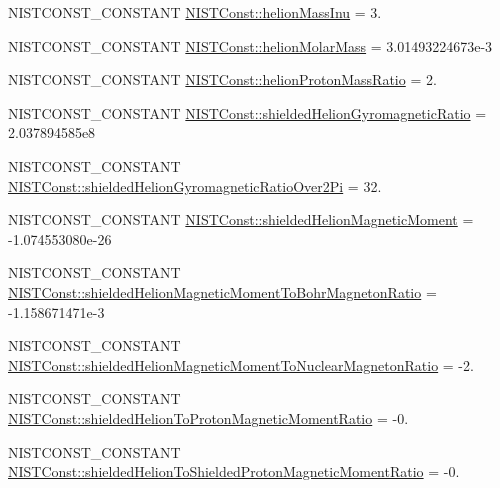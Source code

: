 \begin{DoxyCompactItemize}
\item 
N\+I\+S\+T\+C\+O\+N\+S\+T\+\_\+\+C\+O\+N\+S\+T\+A\+NT \mbox{\hyperlink{group___n_i_s_t_const-_helion_ga6a7b83837aedeb0fc0e2c4640253d1cb}{N\+I\+S\+T\+Const\+::helion\+Mass\+Inu}} = 3.
\item 
N\+I\+S\+T\+C\+O\+N\+S\+T\+\_\+\+C\+O\+N\+S\+T\+A\+NT \mbox{\hyperlink{group___n_i_s_t_const-_helion_ga9bf06c78bcf918e6d6e46539b1dc0ce1}{N\+I\+S\+T\+Const\+::helion\+Molar\+Mass}} = 3.\+01493224673e-\/3
\item 
N\+I\+S\+T\+C\+O\+N\+S\+T\+\_\+\+C\+O\+N\+S\+T\+A\+NT \mbox{\hyperlink{group___n_i_s_t_const-_helion_ga23660bb2e50738f34033e672a99e1194}{N\+I\+S\+T\+Const\+::helion\+Proton\+Mass\+Ratio}} = 2.
\item 
N\+I\+S\+T\+C\+O\+N\+S\+T\+\_\+\+C\+O\+N\+S\+T\+A\+NT \mbox{\hyperlink{group___n_i_s_t_const-_helion_ga642741fc0aa8b2966b78b252304d521c}{N\+I\+S\+T\+Const\+::shielded\+Helion\+Gyromagnetic\+Ratio}} = 2.\+037894585e8
\item 
N\+I\+S\+T\+C\+O\+N\+S\+T\+\_\+\+C\+O\+N\+S\+T\+A\+NT \mbox{\hyperlink{group___n_i_s_t_const-_helion_gae89da246fab4d96613f6365bc4c895cf}{N\+I\+S\+T\+Const\+::shielded\+Helion\+Gyromagnetic\+Ratio\+Over2\+Pi}} = 32.
\item 
N\+I\+S\+T\+C\+O\+N\+S\+T\+\_\+\+C\+O\+N\+S\+T\+A\+NT \mbox{\hyperlink{group___n_i_s_t_const-_helion_ga425da6143b23f32e91a4bed842e2f6d5}{N\+I\+S\+T\+Const\+::shielded\+Helion\+Magnetic\+Moment}} = -\/1.\+074553080e-\/26
\item 
N\+I\+S\+T\+C\+O\+N\+S\+T\+\_\+\+C\+O\+N\+S\+T\+A\+NT \mbox{\hyperlink{group___n_i_s_t_const-_helion_ga7b496ea143c3603e453977b9db2da2d7}{N\+I\+S\+T\+Const\+::shielded\+Helion\+Magnetic\+Moment\+To\+Bohr\+Magneton\+Ratio}} = -\/1.\+158671471e-\/3
\item 
N\+I\+S\+T\+C\+O\+N\+S\+T\+\_\+\+C\+O\+N\+S\+T\+A\+NT \mbox{\hyperlink{group___n_i_s_t_const-_helion_gaa9f99582deb07b11950247bb6aebf383}{N\+I\+S\+T\+Const\+::shielded\+Helion\+Magnetic\+Moment\+To\+Nuclear\+Magneton\+Ratio}} = -\/2.
\item 
N\+I\+S\+T\+C\+O\+N\+S\+T\+\_\+\+C\+O\+N\+S\+T\+A\+NT \mbox{\hyperlink{group___n_i_s_t_const-_helion_gafd8c45f976fd729ed29b2c49434a6ec1}{N\+I\+S\+T\+Const\+::shielded\+Helion\+To\+Proton\+Magnetic\+Moment\+Ratio}} = -\/0.
\item 
N\+I\+S\+T\+C\+O\+N\+S\+T\+\_\+\+C\+O\+N\+S\+T\+A\+NT \mbox{\hyperlink{group___n_i_s_t_const-_helion_gab3aafda5bad54b0ce79e85f2c142ebb2}{N\+I\+S\+T\+Const\+::shielded\+Helion\+To\+Shielded\+Proton\+Magnetic\+Moment\+Ratio}} = -\/0.
\end{DoxyCompactItemize}


